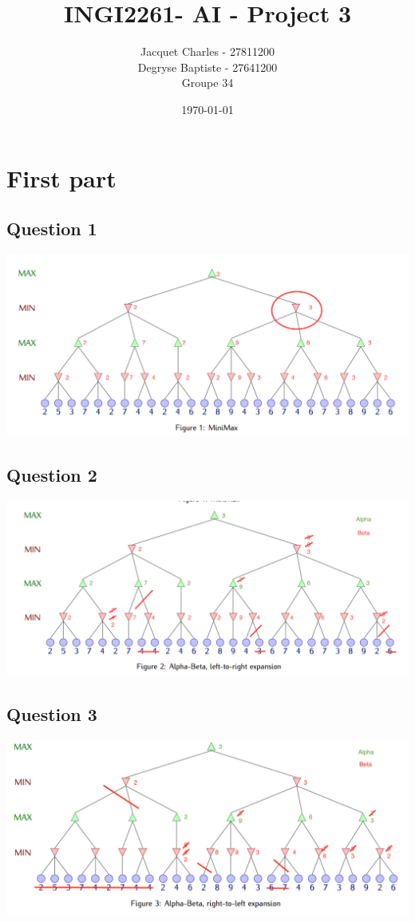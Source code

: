\documentclass[10pt]{report}
\title{INGI2261- AI - Project 3}
\author{Jacquet Charles - 27811200 \\ Degryse Baptiste - 27641200\\ Groupe 34}
\date\today
\begin{document}
\maketitle
\section*{First part}
\subsection*{Question 1}
\begin{center}
\includegraphics[scale=0.4]{MiniMax}
\end{center}
\subsection*{Question 2}
\begin{center}
\includegraphics[scale=0.4]{alpha-beta}
\end{center}
\subsection*{Question 3}
\begin{center}
\includegraphics[scale=0.4]{alpha-beta2}
\end{center}
\end{document}
